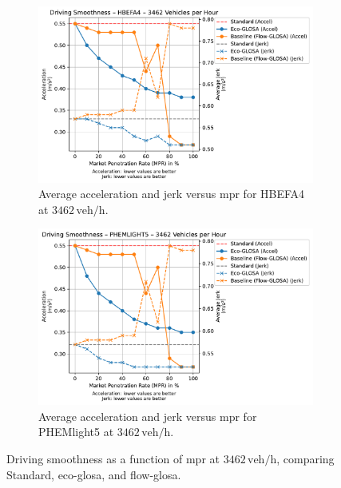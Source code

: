 \begin{figure}[htb]
  \centering
  \begin{subfigure}[b]{0.45\textwidth}
    \includegraphics[width=\textwidth]{data/img/DrivingSmoothness/DrivingSmoothness_HBEFA4_Cars3462.pdf}
    \caption{Average acceleration and jerk versus \ac{mpr} for HBEFA4 at $3462\,\mathrm{veh/h}$.}
    \label{fig:Smoothness_HBEFA4_3462}
  \end{subfigure}\hfill
  \begin{subfigure}[b]{0.45\textwidth}
    \includegraphics[width=\textwidth]{data/img/DrivingSmoothness/DrivingSmoothness_PHEMLIGHT5_Cars3462.pdf}
    \caption{Average acceleration and jerk versus \ac{mpr} for PHEMlight5 at $3462\,\mathrm{veh/h}$.}
    \label{fig:Smoothness_PHEMlight5_3462}
  \end{subfigure}
  \caption{Driving smoothness as a function of \ac{mpr} at $3462\,\mathrm{veh/h}$, comparing Standard, \ac{eco-glosa}, and \ac{flow-glosa}.}
  \label{fig:Smoothness_3462}
\end{figure}

